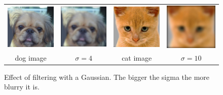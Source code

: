 \documentclass[10pt,letterpaper]{article}
\begin{document}
\begin{figure}[h]
\begin{tabular}{cccc}
\includegraphics[width=0.23\linewidth]{fig/dog.jpg} &
\includegraphics[width=0.23\linewidth]{fig/dog-blurry-4.jpg} & 
\includegraphics[width=0.23\linewidth]{fig/cat.jpg} &
\includegraphics[width=0.23\linewidth]{fig/cat-blurry-10.jpg}\\
dog image & $\sigma=4$ & cat image & $\sigma=10$ \\
\end{tabular}
\caption{\label{fig:blur} Effect of filtering with a Gaussian. The bigger the sigma the more blurry it is.}
\end{figure}
\end{document}
